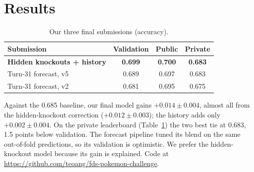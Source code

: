 \section{Results}
\label{sec:results}

\begin{table}[h!]
  \caption{Our three final submissions (accuracy).}
  \label{tab:results}
  \centering
  \small
  \begin{tabular}{@{}lccc@{}}
    \toprule
    Submission & Validation & Public & Private \\
    \midrule
    \textbf{Hidden knockouts + history} & \textbf{0.699} & \textbf{0.700} & \textbf{0.683} \\
    Turn-31 forecast, v5 & 0.689 & 0.697 & 0.683 \\
    Turn-31 forecast, v2 & 0.681 & 0.695 & 0.675 \\
    \bottomrule
  \end{tabular}
\end{table}

Against the 0.685 baseline, our final model gains $+0.014\pm0.004$, almost all from the
hidden-knockout correction ($+0.012\pm0.003$); the history adds only $+0.002\pm0.004$. On the private leaderboard
(Table~\ref{tab:results}) the two best tie at 0.683, 1.5 points below validation. The forecast pipeline tuned its blend on the same out-of-fold predictions, so its validation
is optimistic. We prefer the
hidden-knockout model because its gain is explained. Code at
\url{https://github.com/teoang/fds-pokemon-challenge}.
